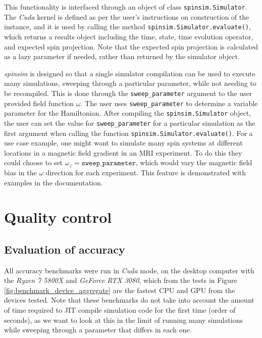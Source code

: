 \documentclass{jors}
\begin{document}
		This functionality is interfaced through an object of class \texttt{spinsim.Simulator}.
		The \emph{Cuda} kernel is defined as per the user’s instructions on construction of the instance, and it is used by calling the method \texttt{spinsim.Simulator.evaluate()}, which returns a results object including the time, state, time evolution operator, and expected spin projection.
		Note that the expected spin projection is calculated as a lazy parameter if needed, rather than returned by the simulator object.

		\emph{spinsim} is designed so that a single simulator compilation can be used to execute many simulations, sweeping through a particular parameter, while not needing to be recompiled.
		This is done through the \texttt{sweep\_parameter} argument to the user provided field function \(\omega\).
		The user uses \texttt{sweep\_parameter} to determine a variable parameter for the Hamiltonian.
		After compiling the \texttt{spinsim.Simulator} object, the user can set the value for \texttt{sweep\_parameter} for a particular simulation as the first argument when calling the function \texttt{spinsim.Simulator.evaluate()}.
		For a use case example, one might want to simulate many spin systems at different locations in a magnetic field gradient in an MRI experiment.
		To do this they could choose to set \(\omega_z =\texttt{sweep\_parameter}\), which would vary the magnetic field bias in the \(\omega\) direction for each experiment.
		This feature is demonstrated with examples in the documentation.

\section{Quality control}
	\subsection{Evaluation of accuracy}
		All accuracy benchmarks were run in \emph{Cuda} mode, on the desktop computer with the \emph{Ryzen 7 5800X} and \emph{GeForce RTX 3080}, which from the tests in Figure \ref{fig:benchmark_device_aggregate} are the fastest CPU and GPU from the devices tested.
		Note that these benchmarks do not take into account the amount of time required to JIT compile simulation code for the first time (order of seconds), as we want to look at this in the limit of running many simulations while sweeping through a parameter that differs in each one.
		
\end{document}
